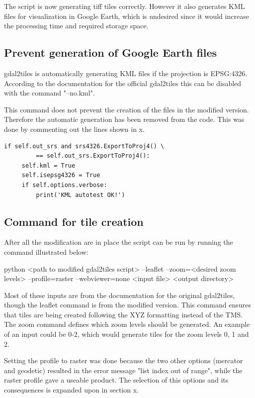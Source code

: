 The script is now generating tiff tiles correctly. However it also generates KML files for visualization in Google Earth, which is undesired since it would increase the processing time and required storage space. 
\subsection{Prevent generation of Google Earth files}
gdal2tiles is automatically generating KML files if the projection is EPSG:4326. According to the documentation for the official gdal2tiles this can be disabled with the command "--no.kml".
\citep{gdal2tilesDoc}


This command does not prevent the creation of the files in the modified version. Therefore the automatic generation has been removed from the code. This was done by commenting out the lines shown in x. 

\begin{lstlisting}[language=iPython, caption={Increasing the bit depth}, label= KML,escapechar=|]
 if self.out_srs and srs4326.ExportToProj4() \
         == self.out_srs.ExportToProj4():
     self.kml = True
     self.isepsg4326 = True
     if self.options.verbose:
         print('KML autotest OK!')
\end{lstlisting}
        



\subsection{Command for tile creation}

After all the modification are in place the script can be run by running the command illustrated below:


python <path to modified gdal2tiles script> --leaflet --zoom=<desired zoom levels> --profile=raster --webviewer=none <input file> <output directory>


Most of these inputs are from the documentation for the original gdal2tiles, though the leaflet command is from the modified version. This command ensures that tiles are being created following the XYZ formatting instead of the TMS. The zoom command defines which zoom levels should be generated. An example of an input could be 0-2, which would generate tiles for the zoom levels 0, 1 and 2. 

Setting the profile to raster was done because the two other options (mercator and geodetic) resulted in the error message "list index out of range", while the raster profile gave a useable product. The selection of this options and its consequences is expanded upon in section x.  

